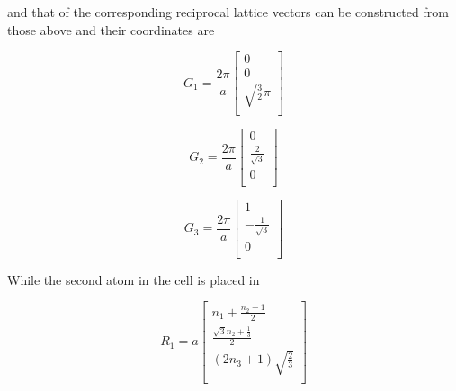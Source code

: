 \documentclass[a4paper]{article}
\begin{document}
and that of the corresponding reciprocal lattice vectors can be constructed from those above and their coordinates are \\
\begin{minipage}{0.3\textwidth}
    \centering
    \begin{equation*}
    G_1 = \frac{2\pi}{a}
    \begin{bmatrix}
        0 \\
        0 \\
        \sqrt{\frac{3}{2}}\pi \\
        
    \end{bmatrix}
    \end{equation*}
    
    \end{minipage}
    \begin{minipage}{0.3\textwidth}
    \centering
    \begin{equation*}
    G_2 = \frac{2\pi}{a}
    \begin{bmatrix}
        0 \\
        \frac{2}{\sqrt{3}}  \\
        0 \\
    \end{bmatrix}
    \end{equation*}
    \end{minipage}
    \begin{minipage}{0.3\textwidth}
    \centering
    \begin{equation*}
    G_3 = \frac{2\pi}{a}
    \begin{bmatrix}
        1 \\
        -\frac{1}{\sqrt{3}}  \\
        0 \\
    \end{bmatrix}
    \end{equation*}
    \end{minipage}

    While the second atom in the cell is placed in
    \begin{minipage}{0.3\textwidth}
        \centering
        \begin{equation*}
        R_1 = a
        \begin{bmatrix}
            n_1 + \frac{n_2 + 1}{2} \\
            \frac{\sqrt{3}n_2 + \frac{1}{3}}{2} \\
            (2n_3 + 1)\sqrt{\frac{2}{3}} \\
            
        \end{bmatrix}
        \end{equation*}
        
        \end{minipage}
        
\end{document}
